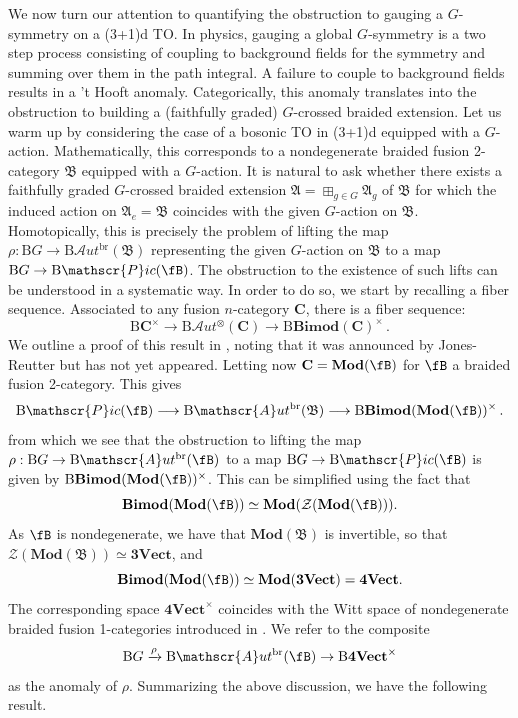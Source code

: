 \documentclass[11pt,reqno]{amsart}
\DeclareMathOperator{\br}{br}
\DeclareMathOperator{\Bimod}{\mathbf{Bimod}}
\newcommand{\Mod}{\mathbf{Mod}}
\newcommand{\sPic}{\mathscr{P}ic}
\newcommand{\cZ}{\mathcal{Z}}
\newcommand{\sAut}{\mathscr{A}ut}
\newcommand{\rB}{\mathrm{B}}
\numberwithin{equation}{section}
\theoremstyle{plain}
\theoremstyle{definition}
\begin{document}
We now turn our attention to quantifying the obstruction to gauging a $G$-symmetry on a  (3+1)d TO. In physics, gauging a global $G$-symmetry is a two step process consisting of coupling to background fields for the symmetry and summing over them in the path integral. A failure to couple to background fields results in a 't Hooft anomaly. Categorically, this anomaly translates into the obstruction to building a (faithfully graded) $G$-crossed braided extension.
Let us warm up by considering the case of a bosonic TO in (3+1)d equipped with a $G$-action. Mathematically, this corresponds to a nondegenerate braided fusion 2-category $\mathfrak{B}$ equipped with a $G$-action.
It is natural to ask whether there exists a faithfully graded $G$-crossed braided extension $\mathfrak{A} = \boxplus_{g\in G}\mathfrak{A}_g$ of $\mathfrak{B}$ for which the induced action on $\mathfrak{A}_e=\mathfrak{B}$ coincides with the given $G$-action on $\mathfrak{B}$. Homotopically, this is precisely the problem of lifting the map $\rho:\rB G \rightarrow \rB\mathscr{A}ut^{\mathrm{br}}(\mathfrak{B})$ representing the given $G$-action on $\mathfrak{B}$ to a map $\rB G \rightarrow \rB \mathscr{P}ic(\fB)$.
The obstruction to the existence of such lifts can be understood in a systematic way. In order to do so, we start by recalling a fiber sequence. Associated to any fusion $n$-category $\mathbf{C}$, there is a fiber sequence:
\begin{equation}\label{eq:fiberseq}
   \rB  \mathbf{C}^{\times}\longrightarrow  \rB\mathscr{A}ut^{\otimes}(\mathbf{C})\longrightarrow  \rB \mathbf{Bimod}(\mathbf{C})^{\times}\,.
\end{equation}
We outline a proof of this result in , noting that it was announced by Jones-Reutter but has not yet appeared.
Letting now $\mathbf{C}  = \Mod(\fB)$ for $\fB$ a braided fusion 2-category. This gives 
\begin{equation}\label{eq:SES2cat}
     \rB \sPic(\fB)\longrightarrow  \rB\mathscr{A}ut^{\mathrm{br}}(\mathfrak{B})\longrightarrow \rB \mathbf{Bimod}(\Mod(\fB))^{\times}\,.
\end{equation}
from which we see that the obstruction to lifting the map $\rho:\rB G \rightarrow \rB\sAut^{\br}(\fB)$ to a map  $ \rB G \rightarrow \rB \sPic(\fB)$ is given by $\rB \mathbf{Bimod}(\Mod(\fB))^{\times}$. This can be simplified using the fact that 
\begin{equation}\label{eq:Bimodrelation}
    \Bimod(\Mod(\fB)) \simeq \Mod(\cZ(\Mod(\fB))).
\end{equation}
As $\fB$ is nondegenerate, we have that $\mathbf{Mod}(\mathfrak{B})$ is invertible, so that $\mathcal{Z}(\mathbf{Mod}(\mathfrak{B}))\simeq\mathbf{3Vect}$, and 
$$\Bimod(\Mod(\fB))\simeq \mathbf{Mod}(\mathbf{3Vect})=\mathbf{4Vect}.$$
The corresponding space $\mathbf{4Vect}^{\times}$ coincides with the Witt space of nondegenerate braided fusion 1-categories introduced in \cite{DMNO}. We refer to the composite
$$\rB G \xrightarrow{\rho} \rB\sAut^{\br}(\fB)\rightarrow \rB \mathbf{4Vect}^{\times}$$
as the anomaly of $\rho$. Summarizing the above discussion, we have the following result.
\end{document}
